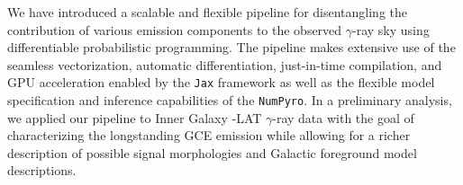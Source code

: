 \documentclass[prd,aps,10pt,nofootinbib,twocolumn,superscriptaddress,preprintnumbers,balancelastpage,longbibliography,floatfix]{revtex4-2}
\begin{document}


We have introduced a scalable and flexible pipeline for disentangling the contribution of various emission components to the observed $\gamma$-ray sky using differentiable probabilistic programming. The pipeline makes extensive use of the seamless vectorization, automatic differentiation, just-in-time compilation, and GPU acceleration enabled by the \texttt{Jax} framework as well as the flexible model specification and inference capabilities of the \texttt{NumPyro}. 
In a preliminary analysis, we applied our pipeline to Inner Galaxy \Fermi-LAT $\gamma$-ray data with the goal of characterizing the longstanding GCE emission while allowing for a richer description of possible signal morphologies and Galactic foreground model descriptions.
\end{document}
